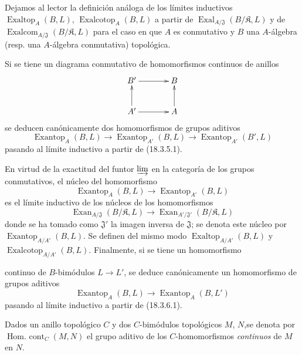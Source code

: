 \begin{env}[18.5.1]
Dejamos al lector la definición análoga de los límites inductivos
$\operatorname{Exaltop}_A(B,L)$, $\operatorname{Exalcotop}_A(B,L)$ a partir de
$\operatorname{Exal}_{A/\mathfrak J}(B/\mathfrak K,L)$ y de
$\operatorname{Exalcom}_{A/\mathfrak J}(B/\mathfrak K,L)$ para el caso en que $A$
es conmutativo y $B$ una $A$-álgebra (resp. una $A$-álgebra conmutativa)
topológica.
\end{env}

\begin{env}[18.5.2]
\label{0.18.5.2-fr}
Si se tiene un diagrama conmutativo de homomorfismos continuos de anillos
\[
  \xymatrix@C=3pc@R=2pc{
    B'\ar[r] & B\\
    A'\ar[u]\ar[r] & A\ar[u]
  }
\]
se deducen canónicamente dos homomorfismos de grupos aditivos
\[
  \operatorname{Exantop}_A(B,L)
  \longrightarrow\operatorname{Exantop}_{A'}(B,L)
  \longrightarrow\operatorname{Exantop}_{A'}(B',L)
\]
pasando al límite inductivo a partir de (18.3.5.1).

En virtud de la exactitud del funtor $\varinjlim$ en la categoría de los grupos
conmutativos, el núcleo del homomorfismo
\[
  \operatorname{Exantop}_A(B,L)
  \longrightarrow\operatorname{Exantop}_{A'}(B,L)
\]
es el límite inductivo de los núcleos de los homomorfismos
\[
  \operatorname{Exan}_{A/\mathfrak J}(B/\mathfrak K,L)
  \longrightarrow
  \operatorname{Exan}_{A'/\mathfrak J'}(B/\mathfrak K,L)
\]
donde se ha tomado como $\mathfrak J'$ la imagen inversa de $\mathfrak J$; se denota
este núcleo por $\operatorname{Exantop}_{A/A'}(B,L)$. Se definen del mismo modo
$\operatorname{Exaltop}_{A/A'}(B,L)$ y
$\operatorname{Exalcotop}_{A/A'}(B,L)$. Finalmente, si se tiene un homomorfismo


continuo de $B$-bimódulos $L\to L'$, se deduce canónicamente un
homomorfismo de grupos aditivos
\[
  \operatorname{Exantop}_A(B,L)\longrightarrow
  \operatorname{Exantop}_A(B,L')
\]
pasando al límite inductivo a partir de (18.3.6.1).
\end{env}

\begin{env}[18.5.3]
\label{0.18.5.3-fr}
Dados un anillo topológico $C$ y dos $C$-bimódulos topológicos
$M$, $N$,\linebreak se denota por $\operatorname{Hom.\ cont}_C(M,N)$ el grupo aditivo de los
$C$-homomorfismos \emph{continuos} de $M$ en $N$.
\end{env}

